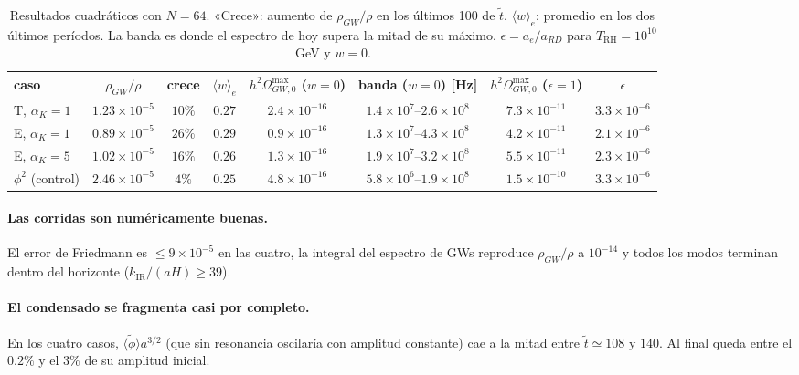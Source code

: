\documentclass[11pt]{article}
\begin{document}
            \begin{table}[H]
                \centering
                \footnotesize
                \setlength{\tabcolsep}{3pt}
                \begin{tabular}{lccccccc}
                    \toprule
                    caso & $\rho_{GW}/\rho$ & crece & $\langle w\rangle_e$ & $h^2\Omega^{\max}_{GW,0}$ ($w{=}0$) & banda ($w{=}0$) [Hz] & $h^2\Omega^{\max}_{GW,0}$ ($\epsilon{=}1$) & $\epsilon$ \\
                    \midrule
                    T, $\alpha_K = 1$ & $1.23 \times 10^{-5}$ & $10\%$ & $0.27$ & $2.4 \times 10^{-16}$ & $1.4 \times 10^7$--$2.6 \times 10^8$ & $7.3 \times 10^{-11}$ & $3.3 \times 10^{-6}$ \\
                    E, $\alpha_K = 1$ & $0.89 \times 10^{-5}$ & $26\%$ & $0.29$ & $0.9 \times 10^{-16}$ & $1.3 \times 10^7$--$4.3 \times 10^8$ & $4.2 \times 10^{-11}$ & $2.1 \times 10^{-6}$ \\
                    E, $\alpha_K = 5$ & $1.02 \times 10^{-5}$ & $16\%$ & $0.26$ & $1.3 \times 10^{-16}$ & $1.9 \times 10^7$--$3.2 \times 10^8$ & $5.5 \times 10^{-11}$ & $2.3 \times 10^{-6}$ \\
                    $\phi^2$ (control) & $2.46 \times 10^{-5}$ & $4\%$ & $0.25$ & $4.8 \times 10^{-16}$ & $5.8 \times 10^6$--$1.9 \times 10^8$ & $1.5 \times 10^{-10}$ & $3.3 \times 10^{-6}$ \\
                    \bottomrule
                \end{tabular}
                \caption{Resultados cuadráticos con $N = 64$. «Crece»: aumento de $\rho_{GW}/\rho$ en los últimos 100 de $\tilde t$. $\langle w\rangle_e$: promedio en los dos últimos períodos. La banda es donde el espectro de hoy supera la mitad de su máximo. $\epsilon = a_e/a_{RD}$ para $T_{\text{RH}} = 10^{10}$\,GeV y $w = 0$.}
                \label{tab:resultados-cuadraticos}
            \end{table}

            \paragraph{Las corridas son numéricamente buenas.} El error de Friedmann es $\le 9 \times 10^{-5}$ en las cuatro, la integral del espectro de GWs reproduce $\rho_{GW}/\rho$ a $10^{-14}$ y todos los modos terminan dentro del horizonte ($k_{\text{IR}}/(aH) \ge 39$).

            \paragraph{El condensado se fragmenta casi por completo.} En los cuatro casos, $\langle\tilde\phi\rangle a^{3/2}$ (que sin resonancia oscilaría con amplitud constante) cae a la mitad entre $\tilde t \simeq 108$ y $140$. Al final queda entre el $0.2\%$ y el $3\%$ de su amplitud inicial.
\end{document}
